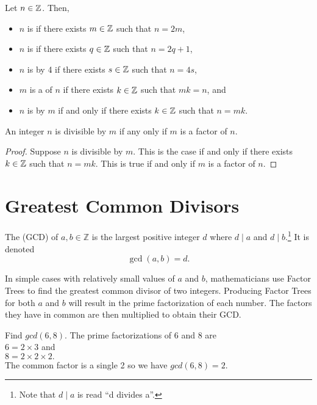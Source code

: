\begin{definition}  Let $n\in\mathbb{Z}$.  Then, 
\begin{itemize}
\item $n$ is  if there exists $m\in\mathbb{Z}$ such that $n=2m$,
\item $n$ is  if there exists $q\in \mathbb{Z}$ such that $n=2q+1$,
\item $n$ is  by 4 if there exists $s\in\mathbb{Z}$ such that $n=4s$,
\item $m$ is a  of $n$ if there exists $k \in \mathbb{Z}$ such that $mk=n$, and
\item $n$ is  by $m$ if and only if there exists $k \in \mathbb{Z}$ such that $n=mk$.
\end{itemize}
\end{definition}

\begin{proposition} An integer $n$ is divisible by $m$ if any only if $m$ is a factor of $n$.
\end{proposition}

\begin{proof}  Suppose $n$ is divisible by $m$.  This is the case if and only if there exists $k \in \mathbb{Z}$ such that $n = mk$.  This is true if and only if $m$ is a factor of $n$.\end{proof}

\section{Greatest Common Divisors}


\begin{definition} The  (GCD) of
    $a, b \in \mathbb{Z}$
    is the largest positive integer $d$ where 
    $d \mid a$ and  $d \mid b.$\footnote{Note that $d \mid a$ is read ``d divides a''.}  It is denoted
    \[\gcd(a, b) = d.\]
\end{definition}

In simple cases with relatively small values of $a$ and $b$, mathematicians use Factor Trees to find the greatest common divisor of two integers. Producing Factor Trees for both $a$ and $b$ will result in the prime factorization of each number. The factors they have in common are then multiplied to obtain their GCD.


\begin{example} Find $gcd(6, 8)$.
\center The prime factorizations of 6 and 8 are \\
$6 = 2 \times 3$ and \\
$8 = 2 \times 2 \times 2.$ 
\\The common factor is a single 2 so we have $gcd(6, 8) = 2$.
\end{example}



